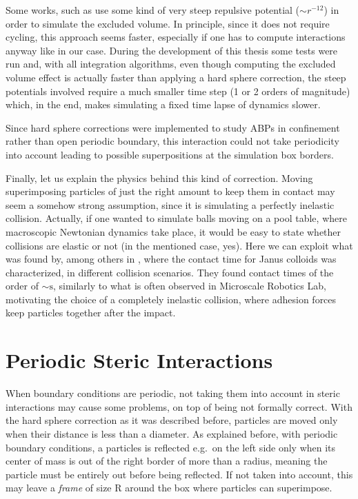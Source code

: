 \documentclass[../../master_thesis_np.tex]{subfiles}
\begin{document}
	Some works, such as \cite{martin-gomez_collective_2018, caprini_spontaneous_2020} use some kind of very steep repulsive potential ($\sim r^{-12}$) in order to simulate the excluded volume. In principle, since it does not require cycling, this approach seems faster, especially if one has to compute interactions anyway like in our case. During the development of this thesis some tests were run and, with all integration algorithms, even though computing the excluded volume effect is actually faster than applying a hard sphere correction, the steep potentials involved require a much smaller time step (1 or 2 orders of magnitude) which, in the end, makes simulating a fixed time lapse of dynamics slower.
	
	Since hard sphere corrections were implemented to study ABPs in confinement rather than open periodic boundary, this interaction could not take periodicity into account leading to possible superpositions at the simulation box borders.
	
	Finally, let us explain the physics behind this kind of correction. Moving superimposing particles of just the right amount to keep them in contact may seem a somehow strong assumption, since it is simulating a perfectly inelastic collision. Actually, if one wanted to simulate balls moving on a pool table, where macroscopic Newtonian dynamics take place, it would be easy to state whether collisions are elastic or not (in the mentioned case, yes). Here we can exploit what was found by, among others \citeauthor{singh_pair_2024} in \cite{singh_pair_2024}, where the contact time for Janus colloids was characterized, in different collision scenarios. They found contact times of the order of $\sim \text{s}$, similarly to what is often observed in Microscale Robotics Lab, motivating the choice of a completely inelastic collision, where adhesion forces keep particles together after the impact. 

	\section{Periodic Steric Interactions}
	When boundary conditions are periodic, not taking them into account in steric interactions may cause some problems, on top of being not formally correct. With the hard sphere correction as it was described before, particles are moved only when their distance is less than a diameter. As explained before, with periodic boundary conditions, a particles is reflected e.g.~on the left side only when its center of mass is out of the right border of more than a radius, meaning the particle must be entirely out before being reflected. If not taken into account, this may leave a \emph{frame} of size R around the box where particles can superimpose. 
	
\end{document}
